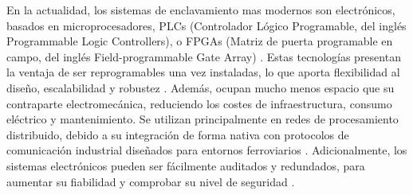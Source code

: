     En la actualidad, los sistemas de enclavamiento mas modernos son electrónicos, basados en microprocesadores, PLCs (Controlador Lógico Programable, del inglés Programmable Logic Controllers), o FPGAs (Matriz de puerta programable en campo, del inglés Field-programmable Gate Array) \cite{Paper_3,Paper_8,Paper_16,Paper_18,Paper_22,Paper_24,Paper_25,Paper_28,Paper_31,Paper_34,Paper_35,Paper_36}. Estas tecnologías presentan la ventaja de ser reprogramables una vez instaladas, lo que aporta flexibilidad al diseño, escalabilidad y robustez \cite{Paper_38,Paper_46,Paper_47,Paper_118,Paper_124,Paper_128,Paper_130,Paper_131,Paper_133,Paper_135,Paper_204}. Además, ocupan mucho menos espacio que su contraparte electromecánica, reduciendo los costes de infraestructura, consumo eléctrico y mantenimiento. Se utilizan principalmente en redes de procesamiento distribuido, debido a su integración de forma nativa con protocolos de comunicación industrial diseñados para entornos ferroviarios \cite{Paper_125,Paper_37,Paper_41}. Adicionalmente, los sistemas electrónicos pueden ser fácilmente auditados y redundados, para aumentar su fiabilidad y comprobar su nivel de seguridad \cite{Paper_23,Paper_29,Paper_43,Paper_49,Paper_97,Paper_98,Paper_132,Paper_140}.